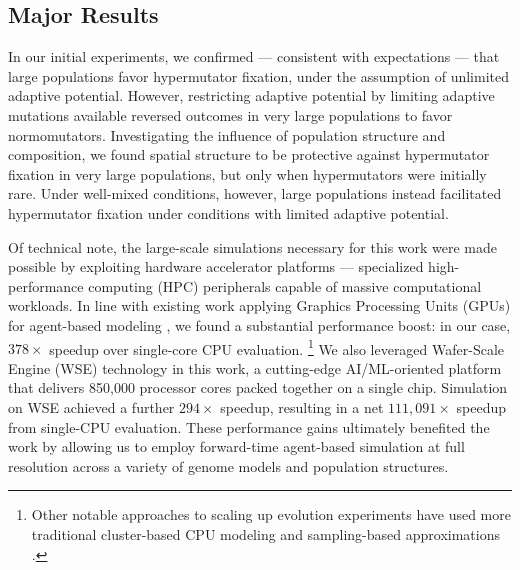 \subsection{Major Results}

In our initial experiments, we confirmed --- consistent with expectations --- that large populations favor hypermutator fixation, under the assumption of unlimited adaptive potential.
However, restricting adaptive potential by limiting adaptive mutations available reversed outcomes in very large populations to favor normomutators.
Investigating the influence of population structure and composition, we found spatial structure to be protective against hypermutator fixation in very large populations, but only when hypermutators were initially rare.
Under well-mixed conditions, however, large populations instead facilitated hypermutator fixation under conditions with limited adaptive potential.

Of technical note, the large-scale simulations necessary for this work were made possible by exploiting hardware accelerator platforms --- specialized high-performance computing (HPC) peripherals capable of massive computational workloads.
In line with existing work applying Graphics Processing Units (GPUs) for agent-based modeling \citep{turpin2021xaevol,kosiachenko2019mass,perumalla2009switching,heinemann2007artificial,richmond2023flame}, we found a substantial performance boost: in our case, $378\times$ speedup over single-core CPU evaluation.
\footnote{%
Other notable approaches to scaling up evolution experiments have used more traditional cluster-based CPU modeling \citep{moreno2022best,collier2015large,ray1995proposal,turpin2020paevol} and sampling-based approximations \citep{taddei1997role}.
}
We also leveraged Wafer-Scale Engine (WSE) technology in this work, a cutting-edge AI/ML-oriented platform that delivers 850,000 processor cores packed together on a single chip.
Simulation on WSE achieved a further $294\times$ speedup, resulting in a net $111{,}091\times$ speedup from single-CPU evaluation.
These performance gains ultimately benefited the work by allowing us to employ forward-time agent-based simulation at full resolution across a variety of genome models and population structures.
